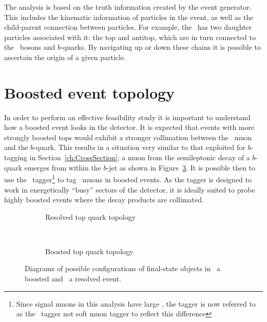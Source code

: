 The analysis is based on the truth information created by the event generator. This includes the kinematic information of particles in the event, as well as the child-parent connection between particles. For example, the \Zprime\ has two daughter particles associated with it: the top and antitop, which are in turn connected to the \W\ bosons and $b$-quarks. By navigating up or down these chains it is possible to ascertain the origin of a given particle.

\section{Boosted event topology}

In order to perform an effective feasibility study it is important to understand how a boosted event looks in the detector. It is expected that events with more strongly boosted tops would exhibit a stronger collimation between the \W\ muon and the $b$-quark. This results in a situation very similar to that exploited for $b$-tagging in Section~\ref{ch:CrossSection}; a muon from the semileptonic decay of a $b$-quark emerges from within the $b$-jet as shown in Figure~\ref{fig:SimpleAngularDiagrams}. It is possible then to use the \xsm\ tagger\footnote{Since signal muons in this analysis have large \pt, the tagger is now referred to as the \xsm\ tagger not soft muon tagger to reflect this difference} to tag \W\ muons in boosted events. As the tagger is designed to work in energetically ``busy'' sectors of the detector, it is ideally suited to probe highly boosted events where the decay products are collimated.

\begin{figure}[htbp]
  \centering
  \begin{subfigure}[b]{0.46\textwidth}
    \centering
      \def\svgwidth{184pt}
      
      \caption{Resolved top quark topology}
    \label{fig:NonBoostedDiagram}
  \end{subfigure}%
  ~
  \begin{subfigure}[b]{0.46\textwidth}
    \centering
      \def\svgwidth{147pt}
      
      \caption{Boosted top quark topology}
    \label{fig:BoostedDiagram}
  \end{subfigure}
  \caption[Diagrams of possible configurations of final-state objects in a boosted and a resolved event.]{Diagrams of possible configurations of final-state objects in~ a boosted and~ a resolved event.} \label{fig:SimpleAngularDiagrams}
\end{figure}

